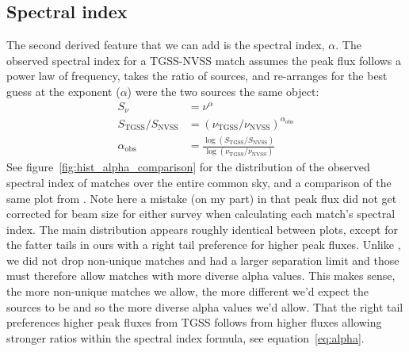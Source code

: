 \documentclass[12pt,a4paper]{article}
\begin{document}
\subsection{Spectral index}
The second derived feature that we can add is the spectral index, $\alpha$. The observed spectral index for a TGSS-NVSS match assumes the peak flux follows a power law of frequency, takes the ratio of sources, and re-arranges for the best guess at the exponent ($\alpha$) were the two sources the same object:
\begin{equation}
\label{eq:alpha}
\begin{split}
S_\nu &= \nu^\alpha \\
S_\mathrm{TGSS}/S_\mathrm{NVSS} &= (\nu_\mathrm{TGSS}/\nu_\mathrm{NVSS})^{\alpha_\mathrm{obs}} \\
\alpha_\mathrm{obs} &= \frac{\log(S_\mathrm{TGSS}/S_\mathrm{NVSS})}{\log(\nu_\mathrm{TGSS}/\nu_\mathrm{NVSS})}
\end{split}
\end{equation}
See figure~\ref{fig:hist_alpha_comparison} for the distribution of the observed spectral index of matches over the entire common sky, and a comparison of the same plot from \citet{posmatchpaper}. Note here a mistake (on my part) in that peak flux did not get corrected for beam size for either survey when calculating each match's spectral index. The main distribution appears roughly identical between plots, except for the fatter tails in ours with a right tail preference for higher peak fluxes. Unlike \citet{posmatchpaper}, we did not drop non-unique matches and had a larger separation limit and those must therefore allow matches with more diverse alpha values. This makes sense, the more non-unique matches we allow, the more different we'd expect the sources to be and so the more diverse alpha values we'd allow. That the right tail preferences higher peak fluxes from TGSS follows from higher fluxes allowing stronger ratios within the spectral index formula, see equation~\ref{eq:alpha}.\\
\end{document}
